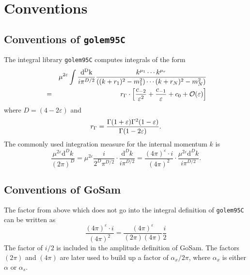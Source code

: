 \documentclass[11pt,a4paper]{refrep}
\newcommand{\gosamversion}{{3{.}0}}
\newcommand{\gosamv}[1][\gosamversion]{{\sc GoSam}\xspace}
\newcommand{\golemVC}{{\tt golem95C}\xspace}
\newcommand{\diff}[1][{}]{{\mathrm{d}}^{#1}\!}
\newcommand{\nn}{\nonumber}
\begin{document}



\appendix

\chapter{Conventions}
\label{sec:conventions}

\section{Conventions of \golemVC}
The integral library \golemVC{} computes integrals of the form
\begin{eqnarray}
&&\mu^{2\varepsilon}\int\frac{\mathrm{d^D k}}{i\pi^{D/2}}\frac{k^{\mu_1}\cdots k^{\mu_r}}{%
((k+r_1)^2-m_1^2)\cdots(k+r_N)^2-m_N^2)}\nn\\
&=&r_\Gamma\cdot\left[\frac{c_{-2}}{\varepsilon^2}+\frac{c_{-1}}{\varepsilon}+c_0
+{\mathcal{O}}(\varepsilon)\right]
\end{eqnarray}
where $D=(4-2\varepsilon)$ and
\begin{equation}
r_\Gamma=\frac{\Gamma(1+\varepsilon)\Gamma^2(1-\varepsilon)}{%
   \Gamma(1-2\varepsilon)}.
\end{equation}
The commonly used integration measure for the internal momentum $k$ is
\begin{equation}
\frac{\mu^{2\varepsilon}\diff[D]k}{(2\pi)^D}
=\mu^{2\varepsilon}\frac{i}{2^D\pi^{D/2}}\cdot\frac{{\mathrm d}^Dk}{i\pi^{D/2}}
=\frac{(4\pi)^\varepsilon \cdot i}{(4\pi)^2}\cdot%
 \frac{\mu^{2\varepsilon}{\mathrm d}^Dk}{i\pi^{D/2}}.
\end{equation}

\section{Conventions of \gosamv}
The factor from above which does not go into the integral definition of
\golemVC{} can be written as
\begin{equation}
\frac{(4\pi)^\varepsilon \cdot i}{(4\pi)^2}=
\frac{(4\pi)^\varepsilon}{(2\pi)(4\pi)}\frac{i}{2}
\end{equation}
The factor of $i/2$ is included in the amplitude definition of \gosamv{}.
The factors $(2\pi)$ and $(4\pi)$ are later used to build up a factor of
$\alpha_x/2\pi$, where $\alpha_x$ is either $\alpha$ or $\alpha_s$.
\end{document}
